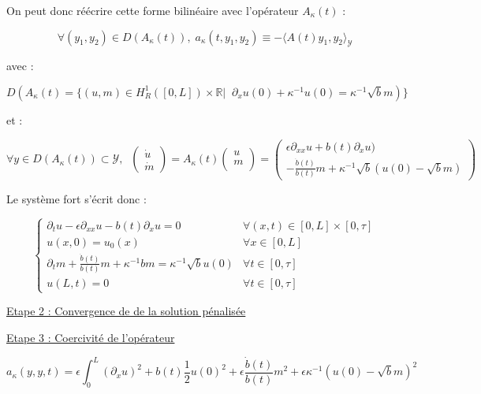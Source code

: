 \documentclass[a4paper]{article}
\newcommand{\dep}{b}
\newcommand{\Y}{\mathscr{Y}}
\newcommand{\Ak}{A_{\kappa}}
\begin{document}
On peut donc réécrire cette forme bilinéaire avec l'opérateur $\Ak(t)$ :

 \[ \forall (y_1,y_2) \in D(\Ak (t)), \; 
 a_\kappa(t,y_1,y_2) \equiv - \langle A(t) y_1,y_2\rangle_{\mathscr{Y}} \]
 
avec :

\[D(\Ak(t) = \{ (u,m) \in H_R^1([0,L])\times \mathbb{R} | \; \;
                  \partial_xu(0) + \kappa^{-1} u(0) = \kappa^{-1} \sqrt{\dep}m) \} \]

et :
 
 \[ \forall y \in D(A_\kappa (t)) \subset \Y, \; \; 
 \left( \begin{array}{c}
 \dot{u}\\
 \dot{m}
 \end{array} \right)
 = \Ak (t) \left( \begin{array}{c}
 u\\
 m\\
 \end{array} \right) 
 = \left(\begin{array}{c}
 \epsilon \partial_{xx} u +\dep (t)\partial_xu )\\
- \displaystyle \frac{\dot{\dep}(t)}{\dep(t)}m 
+ \kappa^{-1}\sqrt{\dep}(u(0)-\sqrt{\dep}m)
 \end{array}\right) \]
 
 Le système fort s'écrit donc :
 
 \begin{equation}
 \label{eq:cas3b}
 \begin{cases}
  \partial_t u -\epsilon \partial_{xx} u - \dep (t)\partial_x u 
   = 0 & \forall (x,t) \in [0,L] \times [0, \tau]\\
  u(x,0) = u_{0} (x) & \forall x \in [0,L] \\
  \partial_t m + \displaystyle \frac{\dot{\dep}(t)}{\dep(t)}m 
   + \kappa^{-1} \dep m = \kappa^{-1}\sqrt{\dep}u(0) 
   & \forall t \in [0,\tau]\\
  u(L,t)=0 & \forall t \in [0,\tau]
 \end{cases}
 \end{equation}

\vspace{0.3cm}
\underline{Etape 2 : Convergence de de la solution pénalisée}


\vspace{0.3cm}
\underline{Etape 3 : Coercivité de l'opérateur}

\[
\displaystyle a_\kappa(y,y,t) = \epsilon \int_0^L (\partial_xu)^2 
  		            + \dep (t) \frac{1}{2}u(0)^2
                    + \epsilon  \frac{\dot{\dep}(t)}{\dep(t)}m^2
				    + \epsilon \kappa^{-1}(u(0)-\sqrt{\dep}m)^2
\]
\end{document}
